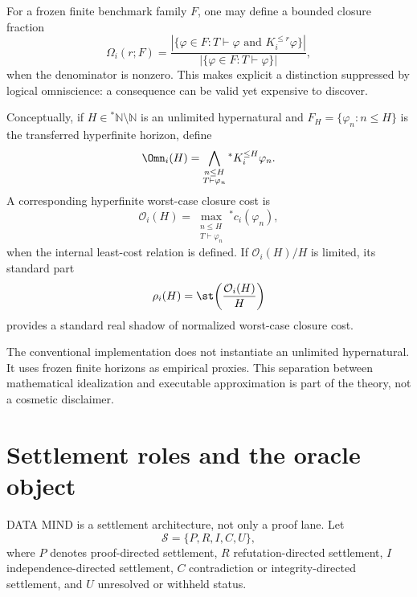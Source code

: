 
For a frozen finite benchmark family $F$, one may define a bounded closure fraction
\begin{equation}
\Omega_i(r;F)=
\frac{\left|\{\varphi\in F:T\vdash\varphi\text{ and }K_i^{\le r}\varphi\}\right|}
{\left|\{\varphi\in F:T\vdash\varphi\}\right|},
\end{equation}
when the denominator is nonzero. This makes explicit a distinction suppressed by logical omniscience: a consequence can be valid yet expensive to discover.

Conceptually, if $H\in{}^*\mathbb N\setminus\mathbb N$ is an unlimited hypernatural and $F_H=\{\varphi_n:n\le H\}$ is the transferred hyperfinite horizon, define
\begin{equation}
\Omn_i(H)=
\bigwedge_{\substack{n\le H\\T\vdash\varphi_n}}
{}^*K_i^{\le H}\varphi_n.
\end{equation}
A corresponding hyperfinite worst-case closure cost is
\begin{equation}
\mathcal O_i(H)=
\max_{\substack{n\le H\\T\vdash\varphi_n}}
{}^*c_i(\varphi_n),
\end{equation}
when the internal least-cost relation is defined. If $\mathcal O_i(H)/H$ is limited, its standard part
\begin{equation}
\rho_i(H)=\st\!\left(\frac{\mathcal O_i(H)}{H}\right)
\end{equation}
provides a standard real shadow of normalized worst-case closure cost.

The conventional implementation does not instantiate an unlimited hypernatural. It uses frozen finite horizons as empirical proxies. This separation between mathematical idealization and executable approximation is part of the theory, not a cosmetic disclaimer.

\section{Settlement roles and the oracle object}

DATA MIND is a settlement architecture, not only a proof lane. Let
\begin{equation}
\mathcal S=\{P,R,I,C,U\},
\end{equation}
where $P$ denotes proof-directed settlement, $R$ refutation-directed settlement, $I$ independence-directed settlement, $C$ contradiction or integrity-directed settlement, and $U$ unresolved or withheld status.

